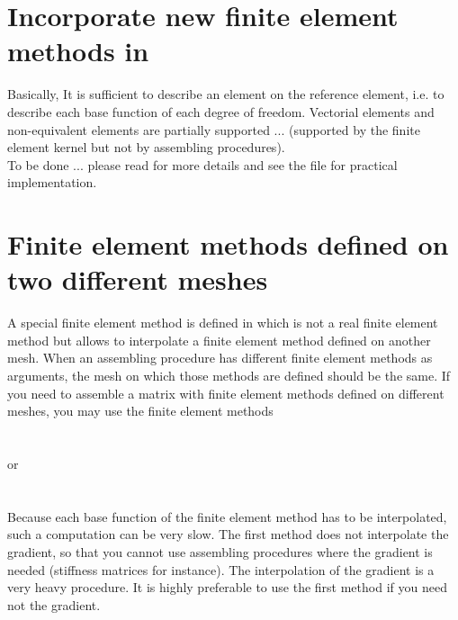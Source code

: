 \documentclass[11pt,a4paper]{article}
\begin{document}
\section{Incorporate new finite element methods in \gf }

Basically, It is sufficient to describe an element on the reference element, i.e. to describe each base function of each degree of freedom. Vectorial elements and non-equivalent elements are partially supported ... (supported by the finite element kernel but not by assembling procedures).\\[0.5cm]
To be done ... please read \cite{BASCOMP} for more details and see the file  for practical implementation.

\section{Finite element methods defined on two different meshes}

A special finite element method is defined in  which is not a real finite element method but allows to interpolate a finite element method defined on another mesh. When an assembling procedure has different finite element methods as arguments, the mesh on which those methods are defined should be the same. If you need to assemble a matrix with finite element methods defined on different meshes, you may use the finite element methods\\[0.5cm]
 \\ \\[0.2cm]
or\\[0.2cm]
 \\ \\[0.5cm]
Because each base function of the finite element method has to be interpolated, such a computation can be very slow. The first method does not interpolate the gradient, so that you cannot use assembling procedures where the gradient is needed (stiffness matrices for instance). The interpolation of the gradient is a very heavy procedure. It is highly preferable to use the first method if you need not the gradient.\\[0.5cm]
\end{document}
